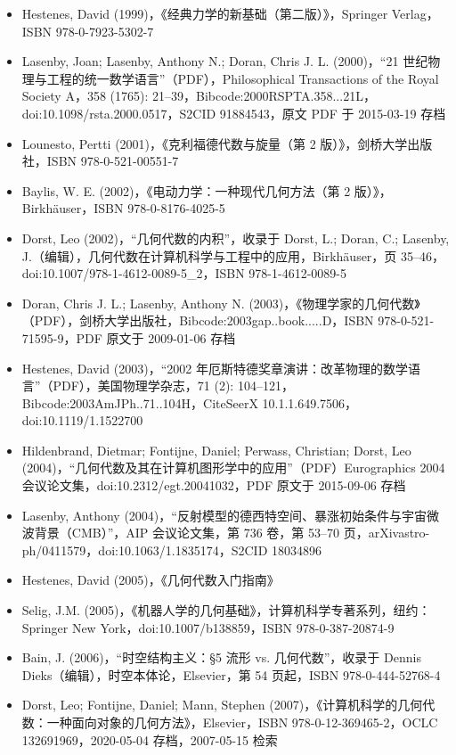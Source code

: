 \begin{itemize}
\item Hestenes, David (1999)，《经典力学的新基础（第二版）》，Springer Verlag，ISBN 978-0-7923-5302-7
\item Lasenby, Joan; Lasenby, Anthony N.; Doran, Chris J. L. (2000)，“21 世纪物理与工程的统一数学语言”（PDF），Philosophical Transactions of the Royal Society A，358 (1765): 21–39，Bibcode:2000RSPTA.358...21L，doi:10.1098/rsta.2000.0517，S2CID 91884543，原文 PDF 于 2015-03-19 存档
\item Lounesto, Pertti (2001)，《克利福德代数与旋量（第 2 版）》，剑桥大学出版社，ISBN 978-0-521-00551-7
\item Baylis, W. E. (2002)，《电动力学：一种现代几何方法（第 2 版）》，Birkhäuser，ISBN 978-0-8176-4025-5
\item Dorst, Leo (2002)，“几何代数的内积”，收录于 Dorst, L.; Doran, C.; Lasenby, J.（编辑），几何代数在计算机科学与工程中的应用，Birkhäuser，页 35–46，doi:10.1007/978-1-4612-0089-5\_2，ISBN 978-1-4612-0089-5
\item Doran, Chris J. L.; Lasenby, Anthony N. (2003)，《物理学家的几何代数》（PDF），剑桥大学出版社，Bibcode:2003gap..book.....D，ISBN 978-0-521-71595-9，PDF 原文于 2009-01-06 存档
\item Hestenes, David (2003)，“2002 年厄斯特德奖章演讲：改革物理的数学语言”（PDF），美国物理学杂志，71 (2): 104–121，Bibcode:2003AmJPh..71..104H，CiteSeerX 10.1.1.649.7506，doi:10.1119/1.1522700
\item Hildenbrand, Dietmar; Fontijne, Daniel; Perwass, Christian; Dorst, Leo (2004)，“几何代数及其在计算机图形学中的应用”（PDF）Eurographics 2004 会议论文集，doi:10.2312/egt.20041032，PDF 原文于 2015-09-06 存档
\item Lasenby, Anthony (2004)，“反射模型的德西特空间、暴涨初始条件与宇宙微波背景（CMB）”，AIP 会议论文集，第 736 卷，第 53–70 页，arXiv\:astro-ph/0411579，doi:10.1063/1.1835174，S2CID 18034896
\item Hestenes, David (2005)，《几何代数入门指南》
\item Selig, J.M. (2005)，《机器人学的几何基础》，计算机科学专著系列，纽约：Springer New York，doi:10.1007/b138859，ISBN 978-0-387-20874-9
\item Bain, J. (2006)，“时空结构主义：§5 流形 vs. 几何代数”，收录于 Dennis Dieks（编辑），时空本体论，Elsevier，第 54 页起，ISBN 978-0-444-52768-4
\item Dorst, Leo; Fontijne, Daniel; Mann, Stephen (2007)，《计算机科学的几何代数：一种面向对象的几何方法》，Elsevier，ISBN 978-0-12-369465-2，OCLC 132691969，2020-05-04 存档，2007-05-15 检索

\end{itemize}
